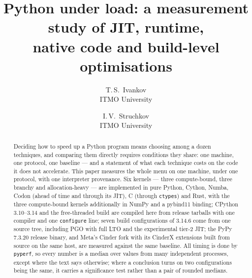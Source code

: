 \documentclass[10pt,a4paper]{article}
\title{\textbf{Python under load: a measurement study of JIT, runtime,\\
native code and build-level optimisations}}
\author{T.\,S.~Ivankov\\ \small ITMO University \and
        I.\,V.~Struchkov\\ \small ITMO University}
\date{}
\newcommand{\code}[1]{\texttt{\small #1}}
\begin{document}
\maketitle
{\renewcommand{\thefootnote}{}}

\begin{abstract}
\noindent
Deciding how to speed up a Python program means choosing among a dozen techniques, and comparing
them directly requires conditions they share: one machine, one protocol, one baseline --- and a
statement of what each technique costs on the code it does not accelerate. This paper measures the whole menu on one machine, under one
protocol, with one interpreter provenance. Six kernels --- three compute-bound, three branchy
and allocation-heavy --- are implemented in pure Python, Cython, Numba, Codon (ahead of
time and through its JIT), C (through \code{ctypes}) and Rust, with the three compute-bound
kernels additionally in NumPy and a pybind11 binding; CPython 3.10--3.14
and the free-threaded build are
compiled here from release tarballs with one compiler and one \code{configure} line; seven build
configurations of 3.14.6 come from one source tree, including PGO with full LTO and the
experimental tier-2 JIT; the PyPy 7.3.20 release binary, and Meta's Cinder fork with its CinderX
extensions built from source on the same host, are measured against the same baseline. All timing is done by \code{pyperf}, so every number is a median over
values from many independent processes, except where the text says otherwise; where a conclusion turns on two configurations being
the same, it carries a significance test rather than a pair of rounded medians.


\end{abstract}
\end{document}
